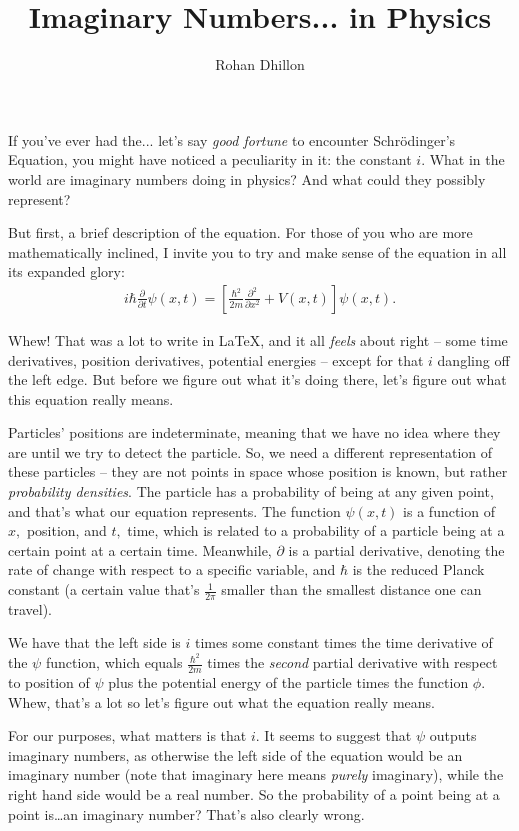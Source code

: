 \documentclass{article}
\title{Imaginary Numbers... in Physics}
\author{Rohan Dhillon}
\begin{document}
\maketitle
If you've ever had the... let's say \textit{good fortune} to encounter Schrödinger's Equation, you might have noticed a peculiarity in it: the constant $i$. What in the world are imaginary numbers doing in physics? And what could they possibly represent?

But first, a brief description of the equation. For those of you who are more mathematically inclined, I invite you to try and make sense of the equation in all its expanded glory:
\begin{align*}
    i\hbar \frac{\partial}{\partial t} \psi (x,t)=\left[ \frac{\hbar^2}{2m}\frac{\partial^2}{\partial x^2}+V(x,t)\right] \psi (x,t).
\end{align*}

Whew! That was a lot to write in \LaTeX, and it all \textit{feels} about right -- some time derivatives, position derivatives, potential energies -- except for that $i$ dangling off the left edge. But before we figure out what it's doing there, let's figure out what this equation really means. 

Particles' positions are indeterminate, meaning that we have no idea where they are until we try to detect the particle.
So, we need a different representation of these particles -- they are not points in space whose position is known, but rather \textit{probability densities}. 
The particle has a probability of being at any given point, and that's what our equation represents. The function $\psi(x,t)$ is a function of $x,$ position, and $t,$ time, which is related to a probability of a particle being at a certain point at a certain time. Meanwhile, $\partial$ is a partial derivative, denoting the rate of change with respect to a specific variable, and $\hbar$ is the reduced Planck constant (a certain value that's $\frac{1}{2\pi}$ smaller than the smallest distance one can travel).

We have that the left side is $i$ times some constant times the time derivative of the $\psi$ function, which equals $\frac{\hbar^2}{2m}$ times the \textit{second} partial derivative with respect to position of $\psi$ plus the potential energy of the particle times the function $\phi.$ Whew, that's a lot so let's figure out what the equation really means.

For our purposes, what matters is that $i.$ It seems to suggest that $\psi$ outputs imaginary numbers, as otherwise the left side of the equation would be an imaginary number (note that imaginary here means \textit{purely} imaginary), while the right hand side would be a real number. So the probability of a point being at a point is\dots an imaginary number? That's also clearly wrong. 
\end{document}
